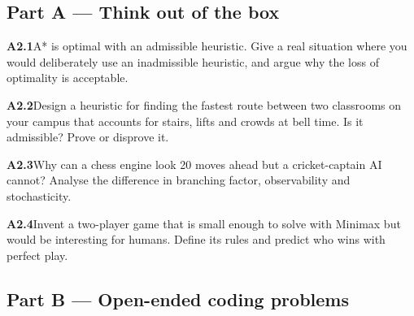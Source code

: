 \documentclass[11pt]{article}
\begin{document}
\subsection*{\color{navy}Part A --- Think out of the box}
\begin{tcolorbox}[enhanced,colback=goldL,colframe=gold!80!black,arc=2mm,boxrule=0.8pt,left=3mm]
\textbf{\color{navy}A2.1}\quad A* is optimal with an admissible heuristic. Give a real situation where you would deliberately use an inadmissible heuristic, and argue why the loss of optimality is acceptable.\hfill{}
\end{tcolorbox}
\begin{tcolorbox}[enhanced,colback=goldL,colframe=gold!80!black,arc=2mm,boxrule=0.8pt,left=3mm]
\textbf{\color{navy}A2.2}\quad Design a heuristic for finding the fastest route between two classrooms on your campus that accounts for stairs, lifts and crowds at bell time. Is it admissible? Prove or disprove it.\hfill{}
\end{tcolorbox}
\begin{tcolorbox}[enhanced,colback=goldL,colframe=gold!80!black,arc=2mm,boxrule=0.8pt,left=3mm]
\textbf{\color{navy}A2.3}\quad Why can a chess engine look 20 moves ahead but a cricket-captain AI cannot? Analyse the difference in branching factor, observability and stochasticity.\hfill{}
\end{tcolorbox}
\begin{tcolorbox}[enhanced,colback=goldL,colframe=gold!80!black,arc=2mm,boxrule=0.8pt,left=3mm]
\textbf{\color{navy}A2.4}\quad Invent a two-player game that is small enough to solve with Minimax but would be interesting for humans. Define its rules and predict who wins with perfect play.\hfill{}
\end{tcolorbox}
\subsection*{\color{navy}Part B --- Open-ended coding problems}
\end{document}
